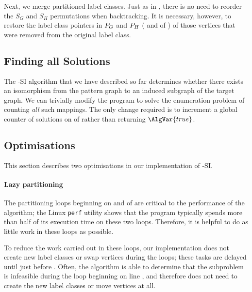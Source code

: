Next, we merge partitioned label classes.  Just as in \McSplit, there is
no need to reorder the $S_G$ and $S_H$ permutations when backtracking.
It is necessary, however, to restore the label class pointers in $P_G$
and $P_H$ ( and 
of ) of those vertices that were removed from
the original label class.

\FloatBarrier

\subsection{Finding all Solutions}

The \McSplit-SI algorithm that we have described so far determines whether there
exists an isomorphism from the pattern graph to an induced subgraph of the target
graph.  We can trivially modify the program to solve the enumeration problem
of counting \emph{all} such mappings.  The only change required is
to increment a global counter of solutions on
 of  rather than returning
$\AlgVar{true}$.

\subsection{Optimisations}\label{subsec:mcsplit-si-optimisations}

This section describes two optimisations in our implementation of \McSplit-SI.

\paragraph{Lazy partitioning}
The partitioning loops beginning on 
and  of  are critical to
the performance of the algorithm; the Linux \texttt{perf} utility shows
that the program typically spends more than half of its execution time
on these two loops.  Therefore, it is helpful to do as little work in these
loops as possible.

To reduce the work carried out in these loops, our implementation does
not create new label classes or swap vertices during the loops; these
tasks are delayed until just before .
Often, the algorithm is able to determine that the subproblem
is infeasible during the loop beginning on line
, and therefore does
not need to create the new label classes or move vertices at all.


